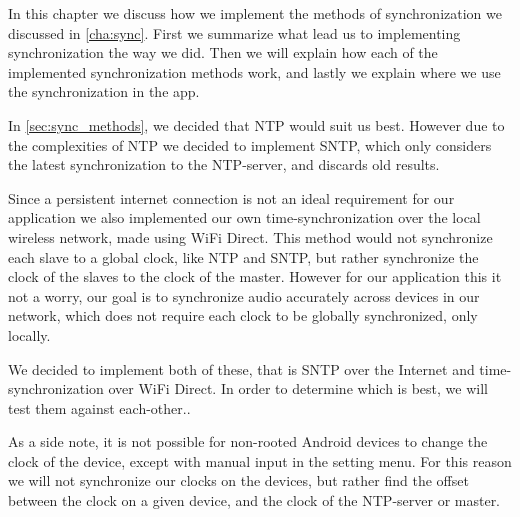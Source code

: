 In this chapter we discuss how we implement the methods of synchronization we discussed in \cref{cha:sync}.
First we summarize what lead us to implementing synchronization the way we did.
Then we will explain how each of the implemented synchronization methods work, and lastly we explain where we use the synchronization in the app.

In \cref{sec:sync_methods}, we decided that \ac{NTP} would suit us best.
However due to the complexities of \ac{NTP} we decided to implement \ac{SNTP}, which only considers the latest synchronization to the \ac{NTP}-server, and discards old results.

Since a persistent internet connection is not an ideal requirement for our application we also implemented our own time-synchronization over the local wireless network, made using WiFi Direct.
This method would not synchronize each slave to a global clock, like \ac{NTP} and \ac{SNTP}, but rather synchronize the clock of the slaves to the clock of the master.
However for our application this it not a worry, our goal is to synchronize audio accurately across devices in our network, which does not require each clock to be globally synchronized, only locally.

We decided to implement both of these, that is \ac{SNTP} over the Internet and time-synchronization over WiFi Direct.
In order to determine which is best, we will test them against each-other..

As a side note, it is not possible for non-rooted Android devices to change the clock of the device, except with manual input in the setting menu.
For this reason we will not synchronize our clocks on the devices, but rather find the offset between the clock on a given device, and the clock of the \ac{NTP}-server or master.
